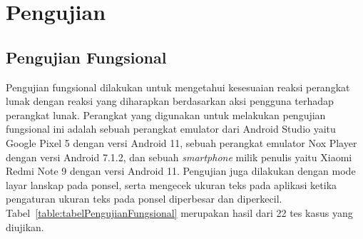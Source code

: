 \section{Pengujian}
\label{sec:pengujian}

\subsection{Pengujian Fungsional}
\label{subsec:pengujianFungsional}

Pengujian fungsional dilakukan untuk mengetahui kesesuaian reaksi perangkat lunak dengan reaksi yang diharapkan berdasarkan aksi pengguna terhadap perangkat lunak. Perangkat yang digunakan untuk melakukan pengujian fungsional ini adalah sebuah perangkat emulator dari Android Studio yaitu Google Pixel 5 dengan versi Android 11, sebuah perangkat emulator Nox Player dengan versi Android 7.1.2, dan sebuah \textit{smartphone} milik penulis yaitu Xiaomi Redmi Note 9 dengan versi Android 11. Pengujian juga dilakukan dengan mode layar lanskap pada ponsel, serta mengecek ukuran teks pada aplikasi ketika pengaturan ukuran teks pada ponsel diperbesar dan diperkecil. Tabel~\ref{table:tabelPengujianFungsional} merupakan hasil dari 22 tes kasus yang diujikan.


